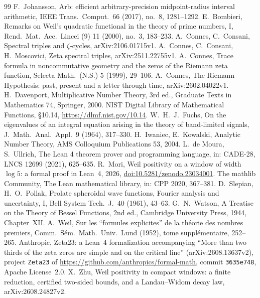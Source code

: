 \documentclass[11pt]{amsart}
\newcommand{\doi}[1]{\href{https://doi.org/#1}{doi:#1}}
\theoremstyle{definition}
\theoremstyle{remark}
\numberwithin{equation}{section}
\begin{document}
\begin{thebibliography}{99}
 F.~Johansson, Arb: efficient arbitrary-precision midpoint-radius interval arithmetic, IEEE Trans.\ Comput.\ 66 (2017), no.~8, 1281--1292.
 E.~Bombieri, Remarks on Weil's quadratic functional in the theory of prime numbers, I, Rend.\ Mat.\ Acc.\ Lincei (9) 11 (2000), no.~3, 183--233.
 A.~Connes, C.~Consani, Spectral triples and $\zeta$-cycles, arXiv:2106.01715v1.
 A.~Connes, C.~Consani, H.~Moscovici, Zeta spectral triples, arXiv:2511.22755v1.
 A.~Connes, Trace formula in noncommutative geometry and the zeros of the Riemann zeta function, Selecta Math.\ (N.S.) 5 (1999), 29--106.
 A.~Connes, The Riemann Hypothesis: past, present and a letter through time, arXiv:2602.04022v1.
 H.~Davenport, Multiplicative Number Theory, 3rd ed., Graduate Texts in Mathematics 74, Springer, 2000.
 NIST Digital Library of Mathematical Functions, \S10.14, \url{https://dlmf.nist.gov/10.14}.
 W.~H.~J.~Fuchs, On the eigenvalues of an integral equation arising in the theory of band-limited signals, J.\ Math.\ Anal.\ Appl.\ 9 (1964), 317--330.
 H.~Iwaniec, E.~Kowalski, Analytic Number Theory, AMS Colloquium Publications 53, 2004.
 L.~de Moura, S.~Ullrich, The Lean 4 theorem prover and programming language, in: CADE-28, LNCS 12699 (2021), 625--635.
 R.~Mori, Weil positivity on a window of width $\log5$: a formal proof in Lean~4, 2026, \doi{10.5281/zenodo.23034001}.
 The mathlib Community, The Lean mathematical library, in: CPP 2020, 367--381.
 D.~Slepian, H.~O.~Pollak, Prolate spheroidal wave functions, Fourier analysis and uncertainty, I, Bell System Tech.\ J.\ 40 (1961), 43--63.
 G.~N.~Watson, A Treatise on the Theory of Bessel Functions, 2nd ed., Cambridge University Press, 1944, Chapter~XII.
 A.~Weil, Sur les ``formules explicites'' de la th\'eorie des nombres premiers, Comm.\ S\'em.\ Math.\ Univ.\ Lund (1952), tome suppl\'ementaire, 252--265.
 Anthropic, Zeta23: a Lean~4 formalization accompanying ``More than two thirds of the zeta zeros are simple and on the critical line'' (arXiv:2608.13637v2), project \texttt{Zeta23} of \url{https://github.com/anthropics/formal-math}, commit \texttt{3635e748}, Apache License~2.0.
 X.~Zhu, Weil positivity in compact windows: a finite reduction, certified two-sided bounds, and a Landau--Widom decay law, arXiv:2608.24827v2.
\end{thebibliography}
\end{document}
